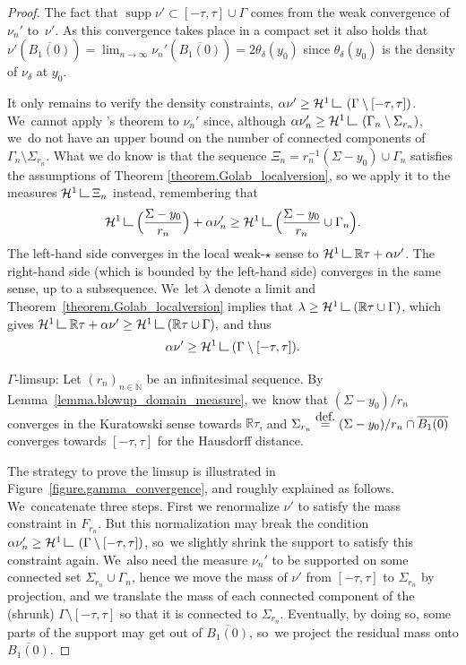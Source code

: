 \documentclass[11pt]{article}
\numberwithin{equation}{section}
\theoremstyle{definition}
\newcommand{\eqdef}{\ensuremath{\stackrel{\mbox{\upshape\tiny def.}}{=}}}
\newcommand\LM[1]{\hbox{\vrule width.5pt \vbox to#1pt{\vfill \hrule width#1pt height.5pt}}}
\newcommand\LL{{\mathchoice {\>\LM7\>}{\>\LM7\>}{\,\LM5\,}{\,\LM{3.35}\,}}}
\newcommand{\mres}{\LL}
\newcommand\cH{\mathcal{H}}
\newcommand{\RR}{\mathbb{R}}
\DeclareMathOperator{\supp}{supp}
\begin{document}
\begin{proof}
The fact that $\supp\nu' \subset [-\tau, \tau]\cup \Gamma$ comes from the weak convergence of~$\nu_{n}'$ to~$\nu'$. As this convergence takes place in a compact set it also holds that $\nu'(\overline{B_1(0)}) = \lim_{n \to \infty} \nu_{n}'(\overline{B_1(0)}) = 2\theta_\delta(y_0)$ since $\theta_\delta(y_0)$ is the density of $\nu_\delta$ at $y_0$.

It only remains to verify the density constraints, $\alpha \nu' \ge \mathcal{H}^1\mres \left(\Gamma\setminus [-\tau,\tau]\right)$. We~cannot apply \Golab's theorem to $\nu_n'$ since, although $\alpha\nu_n' \ge \cH^1\mres \left( \Gamma_n\setminus \Sigma_{r_n}\right)$, we~do not have an upper bound on the number of connected components of $\Gamma_n\setminus \Sigma_{r_n}$. What we do know is that the sequence $\Xi_n = r_n^{-1}(\Sigma - y_0) \cup \Gamma_n$ satisfies the assumptions of Theorem \ref{theorem.Golab_localversion},
so we apply it to the measures $\cH^1\mres\Xi_n$ instead, remembering that
\begin{equation*}
\mathcal{H}^1\mres
\Bigl(
\frac{\Sigma - y_0}{r_n}
\Bigr)
+
\alpha\nu_n'
\ge
\mathcal{H}^1\mres
\Bigl(
\frac{\Sigma - y_0}{r_n}\cup\Gamma_n
\Bigl).
\end{equation*}
The left-hand side converges in the local weak-$\star$ sense to
$\cH^1\mres \RR\tau + \alpha\nu'$. The right-hand side
(which is bounded by the left-hand side)
converges in the same sense, up to a subsequence. We~let
$\lambda$ denote a limit and Theorem~\ref{theorem.Golab_localversion} implies that $\lambda \ge \cH^1\mres (\RR\tau\cup \Gamma)$, which gives
$
\cH^1\mres \RR\tau + \alpha\nu' \ge \cH^1\mres (\RR\tau\cup \Gamma),
$
and thus
\[
\alpha\nu' \ge \cH^1\mres(\Gamma\setminus [-\tau,\tau]).
\]

\par $\Gamma$-limsup: Let $(r_{n})_{n\in\mathbb{N}}$ be an infinitesimal sequence. By Lemma~\ref{lemma.blowup_domain_measure}, we~know that $(\Sigma-y_0)/r_{n}$ converges in the Kuratowski sense towards $\RR\tau$, and $\Sigma_{r_n}\eqdef (\Sigma-\nobreak y_0)/r_{n}\cap\nobreak\overline{B_1(0)}$ converges towards $[-\tau,\tau]$ for the Hausdorff distance.

The strategy to prove the limsup is illustrated in Figure~\ref{figure.gamma_convergence},
and roughly explained as follows. We~concatenate three steps. First we renormalize $\nu'$ to satisfy the mass constraint in $F_{r_{n}}$. But this normalization may break the condition $\alpha \nu_n'\ge \cH^1\mres \left(\Gamma\setminus [-\tau,\tau]\right)$, so~we slightly shrink the support to satisfy this constraint again. We~also need the measure $\nu_{n}'$ to be supported on some connected set $\Sigma_{r_{n}}\cup \Gamma_{n}$, hence we move the mass of $\nu'$ from $[-\tau,\tau]$ to $\Sigma_{r_n}$ by projection, and we translate the mass of each connected component of the (shrunk) $\Gamma\setminus [-\tau,\tau]$ so that it is connected to $\Sigma_{r_n}$. Eventually, by doing so, some parts of the support may get out of $\overline{B_1(0)}$, so~we project the residual mass onto $\overline{B_1(0)}$.


\end{proof}
\end{document}

